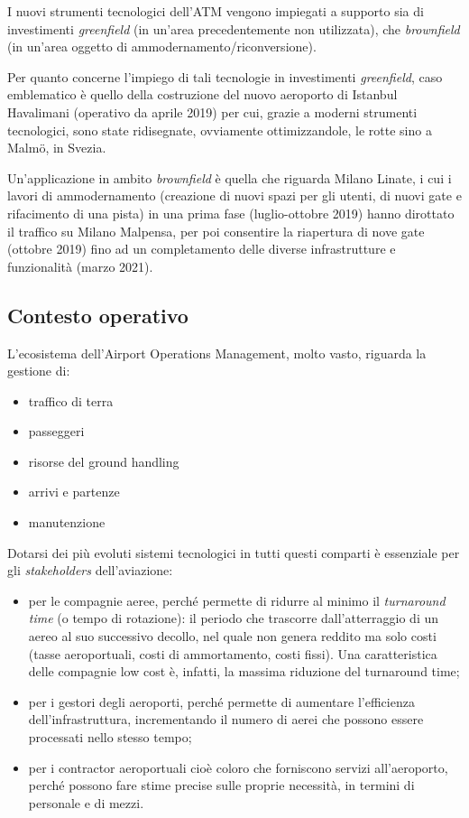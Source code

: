 \documentclass[a4paper, 12pt]{article}
\begin{document}
I nuovi strumenti tecnologici dell’ATM vengono impiegati a supporto sia di investimenti \textit{greenfield} (in un’area precedentemente non utilizzata), che \textit{brownfield} (in un’area oggetto di ammodernamento/riconversione). 

Per quanto concerne l’impiego di tali tecnologie in investimenti \textit{greenfield}, caso emblematico è quello della costruzione del nuovo aeroporto di Istanbul Havalimani (operativo da aprile 2019) per cui, grazie a moderni strumenti tecnologici, sono state ridisegnate, ovviamente ottimizzandole, le rotte sino a Malm{\"o}, in Svezia. 

Un’applicazione in ambito \textit{brownfield} è quella che riguarda Milano Linate, i cui i lavori di ammodernamento (creazione di nuovi spazi per gli utenti, di nuovi gate e rifacimento di una pista) in una prima fase (luglio-ottobre 2019) hanno dirottato il traffico su Milano Malpensa, per poi consentire la riapertura di nove gate (ottobre 2019) fino ad un completamento delle diverse infrastrutture e funzionalità (marzo 2021).
	\subsection{Contesto operativo}
L’ecosistema dell’Airport Operations Management, molto vasto, riguarda la gestione di:
\begin{itemize}
\item traffico di terra
\item passeggeri
\item risorse del ground handling
\item arrivi e partenze
\item manutenzione
\end{itemize}

Dotarsi dei più evoluti sistemi tecnologici in tutti questi comparti è essenziale per gli \textit{stakeholders} dell’aviazione: 
\begin{itemize}
\item per le compagnie aeree, perché permette di ridurre al minimo il \textit{turnaround time} (o tempo di rotazione): il periodo che trascorre dall’atterraggio di un aereo al suo successivo decollo, nel quale non genera reddito ma solo costi (tasse aeroportuali, costi di ammortamento, costi fissi). Una caratteristica delle compagnie low cost è, infatti, la massima riduzione del turnaround time;
\item per i gestori degli aeroporti, perché permette di aumentare l’efficienza dell’infrastruttura, incrementando il numero di aerei che possono essere processati nello stesso tempo;
\item per i contractor aeroportuali cioè coloro che forniscono servizi all’aeroporto, perché possono fare stime precise sulle proprie necessità, in termini di personale e di mezzi.
\end{itemize}
\end{document}
